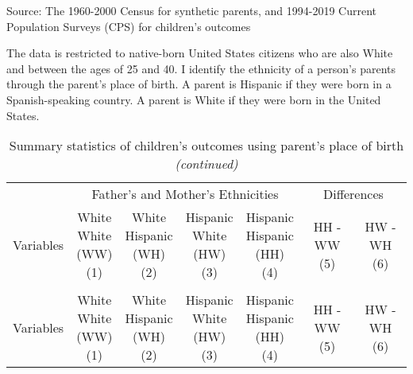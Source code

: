 
\begin{landscape}
\begin{ThreePartTable}
\begin{TableNotes}
\item[1] Source: The 1960-2000 Census for synthetic parents, and 1994-2019 Current Population Surveys (CPS) for children's outcomes
\item[2] The data is restricted to native-born United States citizens who are also White and between the ages of 25 and 40. I identify the ethnicity of a person's parents through the parent's place of birth. A parent is Hispanic if they were born in a Spanish-speaking country. A parent is White if they were born in the United States.
\end{TableNotes}
\begin{longtable}[t]{>{\raggedright\arraybackslash}p{5cm}cccccc}
\caption{Summary statistics of children's outcomes using parent's place of birth \label{tab:c&p1}}\\
\toprule
\multicolumn{1}{c}{ } & \multicolumn{4}{c}{Father's and Mother's Ethnicities} & \multicolumn{2}{c}{Differences} \\
\cmidrule(l{3pt}r{3pt}){2-5} \cmidrule(l{3pt}r{3pt}){6-7}
Variables & \specialcell{White \\ White \\ (WW) \\ (1)} & \specialcell{White \\ Hispanic \\ (WH) \\ (2)} & \specialcell{Hispanic \\ White \\ (HW) \\ (3)} & \specialcell{Hispanic \\ Hispanic \\ (HH) \\ (4)} & \specialcell{HH - WW \\ (5)} & \specialcell{HW - WH \\ (6)}\\
\midrule
\endfirsthead
\caption[]{Summary statistics of children's outcomes using parent's place of birth  \textit{(continued)}}\\
\toprule
Variables & \specialcell{White \\ White \\ (WW) \\ (1)} & \specialcell{White \\ Hispanic \\ (WH) \\ (2)} & \specialcell{Hispanic \\ White \\ (HW) \\ (3)} & \specialcell{Hispanic \\ Hispanic \\ (HH) \\ (4)} & \specialcell{HH - WW \\ (5)} & \specialcell{HW - WH \\ (6)}\\

\end{longtable}
\end{ThreePartTable}
\end{landscape}
